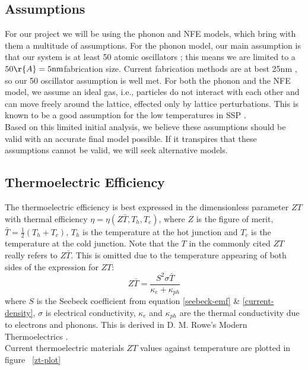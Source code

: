\documentclass[a4paper,10pt,journal]{IEEEtran}
\newcommand{\figref}[2][\figurename~]{#1\ref{#2}}
\begin{document}
\subsection{Assumptions}
For our project we will be using the phonon and \ac{NFE} models, which
bring with them a multitude of assumptions. For the phonon model, our
main assumption is that our system is at least 50 atomic oscillators
\cite{kittel}; this means we are limited to a $50\r{A} = 5
\mathrm{nm}$fabrication size. Current fabrication methods are at best
25nm \cite{minnch-review}, so our 50 oscillator assumption is well met.
For both the phonon and the \ac{NFE} model, we assume an ideal gas,
i.e., particles do not interact with each other and can move freely
around the lattice, effected only by lattice perturbations. This is
known to be a good assumption for the low temperatures in \ac{SSP}
\cite{kittel}.\\
Based on this limited initial analysis, we believe these assumptions
should be valid with an accurate final model possible. If it transpires
that these assumptions cannot be valid, we will seek alternative models.\\

\subsection{Thermoelectric Efficiency}
The thermoelectric efficiency is best expressed in the dimensionless
parameter $ZT$ with thermal efficiency $\eta = \eta (Z\bar{T}, T_h,
T_c)$, where $Z$ is the figure of merit, $\bar{T} = \frac{1}{2}(T_h +
T_c)$, $T_h$ is the temperature at the hot junction and $T_c$ is the
temperature at the cold junction. Note that the $T$ in the commonly
cited $ZT$ really refers to $Z \bar{T}$. This is omitted due to the
temperature appearing of both sides of the expression for $ZT$:
\begin{equation}
\label{zt}
	Z \bar{T} = \frac{S^2 \sigma \bar{T}}{\kappa_e + \kappa_{ph}}
\end{equation}
where $S$ is the Seebeck coefficient from equation \eqref{seebeck-emf}
\& \eqref{current-density}, $\sigma$ is electrical conductivity,
$\kappa_e$ and $\kappa_{ph}$ are the thermal conductivity due to
electrons and phonons. This is derived in D. M. Rowe's Modern
Thermoelectrics \cite{modern-thermoelectrics}.\\
Current thermoelectric materials $ZT$ values against temperature are
plotted in figure \figref{zt-plot}
\end{document}
